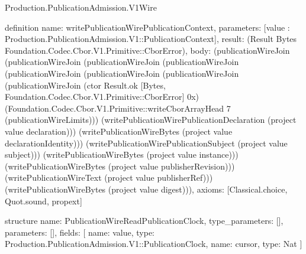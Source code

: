 \begin{lexlean}{Production.PublicationAdmission.V1Wire}
\begin{semanticmodule}
definition{
  name: writePublicationWirePublicationContext,
  parameters: [value : Production.PublicationAdmission.V1::PublicationContext],
  result: (Result Bytes Foundation.Codec.Cbor.V1.Primitive::CborError),
  body: (publicationWireJoin (publicationWireJoin (publicationWireJoin (publicationWireJoin (publicationWireJoin (publicationWireJoin (publicationWireJoin (publicationWireJoin (ctor Result.ok [Bytes, Foundation.Codec.Cbor.V1.Primitive::CborError] 0x) (Foundation.Codec.Cbor.V1.Primitive::writeCborArrayHead 7 (publicationWireLimits))) (writePublicationWirePublicationDeclaration (project value declaration))) (writePublicationWireBytes (project value declarationIdentity))) (writePublicationWirePublicationSubject (project value subject))) (writePublicationWireBytes (project value instance))) (writePublicationWireBytes (project value publisherRevision))) (writePublicationWireText (project value publisherRef))) (writePublicationWireBytes (project value digest))),
  axioms: [Classical.choice, Quot.sound, propext]
}

structure{
  name: PublicationWireReadPublicationClock,
  type_parameters: [],
  parameters: [],
  fields: [
    {name: value, type: Production.PublicationAdmission.V1::PublicationClock},
    {name: cursor, type: Nat}
  ]
}


\end{semanticmodule}
\end{lexlean}
